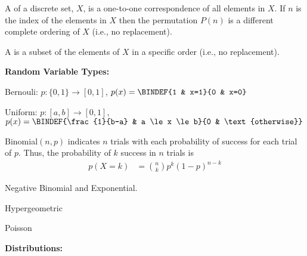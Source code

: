 \documentclass[10pt,a4paper]{report}
\begin{document}
\begin{description}
\begin{description}
		\item A  of a discrete set, $X$, is a one-to-one correspondence of all elements in $X$.  If $n$ is the index of the elements in $X$ then the permutation $P(n)$ is a different complete ordering of $X$ (i.e., no replacement).
		\item A  is a subset of the elements of $X$ in a specific order (i.e., no replacement).
	\end{description}
	
\item \textbf{Random Variable Types:}
\begin{description}
	\item Bernouli: $p:\{0,1\}\to [0,1]$, $p(x)=\BINDEF{1 & x=1}{0 & x=0}$
	\item Uniform: $p:[a,b] \to [0,1]$, $p(x) = \BINDEF{\frac{1}{b-a} & a \le x \le b}{0 & \text{otherwise}}$
	\item Binomial$(n,p)$ indicates $n$ trials with each probability of success for each trial of $p$.  Thus, the probability of $k$ success in $n$ trials is
	\begin{align*}
		p(X=k) &= \binom{n}{k}p^k(1-p)^{n-k}
	\end{align*}
	\item Negative Binomial and Exponential.
	\item Hypergeometric
	\item Poisson
\end{description}
\item \textbf{Distributions:}

\end{description}
\end{document}
